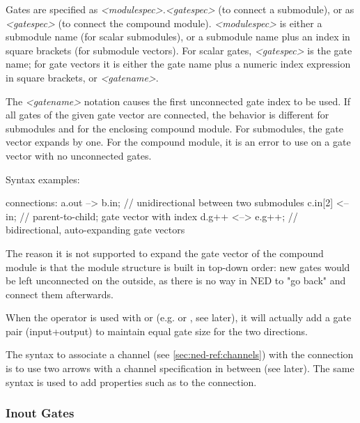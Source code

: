 {Gates are specified as \textit{<modulespec>.<gatespec>} (to connect a submodule),
or as \textit{<gatespec>} (to connect the compound module). \textit{<modulespec>}
is either a submodule name (for scalar submodules), or a submodule name plus
an index in square brackets (for submodule vectors). For scalar gates,
\textit{<gatespec>} is the gate name; for gate vectors it is either
the gate name plus a numeric index expression in square brackets,
or \textit{<gatename>}\ttt{++}.

The \textit{<gatename>}\ttt{++} notation causes the first unconnected gate index
to be used. If all gates of the given gate vector are connected, the behavior
is different for submodules and for the enclosing compound module.
For submodules, the gate vector expands by one. For the compound module,
it is an error to use \ttt{++} on a gate vector with no unconnected gates.

Syntax examples:

\begin{ned}
connections:
   a.out --> b.in;   // unidirectional between two submodules
   c.in[2] <-- in;   // parent-to-child; gate vector with index
   d.g++ <--> e.g++; // bidirectional, auto-expanding gate vectors
\end{ned}

\begin{rationale}
    The reason it is not supported to expand the gate vector of the compound
    module is that the module structure is built in top-down order: new gates
    would be left unconnected on the outside, as there is no way in NED to
    "go back" and connect them afterwards.
\end{rationale}

When the \ttt{++} operator is used with  or 
(e.g.  or , see later), it will actually add
a gate pair (input+output) to maintain equal gate size for the two
directions.

The syntax to associate a channel (see \ref{sec:ned-ref:channels})
with the connection is to use two arrows with a channel specification
in between (see later). The same syntax is used to add properties such as
 to the connection.




\subsubsection{Inout Gates}
\label{sec:ned-ref:inout-gates}

}
